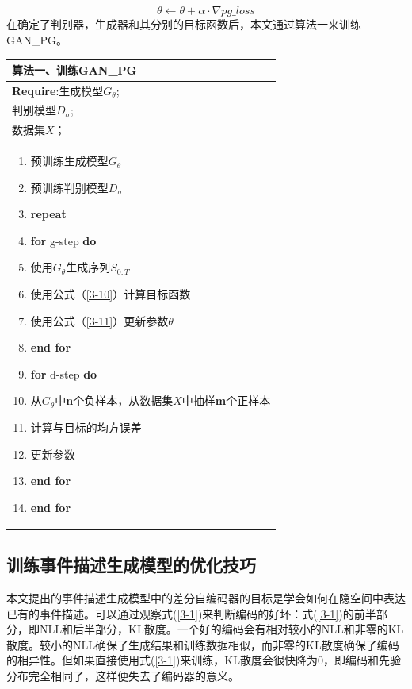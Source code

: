 \begin{equation}\label{3-11}
    \theta \leftarrow \theta + \alpha \cdot \nabla pg\_loss
\end{equation}
在确定了判别器，生成器和其分别的目标函数后，本文通过算法一来训练GAN\_PG。
\begin{table}[htb]
    
    \centering
        \begin{tabular*}{\linewidth}{p{\linewidth}}
\toprule
            算法一、训练GAN\_PG \\
\midrule
\textbf{Require}:生成模型$G_\theta$;\\
判别模型$D_\sigma$;\\
数据集$X$；\\ 
\begin{minipage}[t]{\linewidth}
\begin{enumerate}[itemsep=-3pt]
    \item 预训练生成模型$G_\theta$
    \item 预训练判别模型$D_\sigma$
    \item \textbf{repeat}
    \item \quad \textbf{for} g-step \textbf{do}
    \item \quad \quad 使用$G_\theta$生成序列$S_{0:T}$
    \item \quad \quad 使用公式（\ref{3-10}）计算目标函数
    \item \quad \quad 使用公式（\ref{3-11}）更新参数$\theta$
    \item \quad \textbf{end for}
    \item \quad \textbf{for} d-step \textbf{do}
    \item \quad \quad 从$G_\theta$中\textbf{n}个负样本，从数据集$X$中抽样\textbf{m}个正样本
    \item \quad \quad 计算与目标的均方误差
    \item \quad \quad 更新参数
    \item \quad \textbf{end for}  
    \item \textbf{end for}
\end{enumerate}
\end{minipage}\\
\bottomrule
        \end{tabular*}
    \label{s3-1}
\end{table}

\subsection{训练事件描述生成模型的优化技巧}\label{train_generator}
本文提出的事件描述生成模型中的差分自编码器的目标是学会如何在隐空间中表达已有的事件描述。可以通过观察式(\ref{3-1})来判断编码的好坏：式(\ref{3-1})的前半部分，即NLL和后半部分，KL散度。一个好的编码会有相对较小的NLL和非零的KL散度。较小的NLL确保了生成结果和训练数据相似，而非零的KL散度确保了编码的相异性。但如果直接使用式(\ref{3-1})来训练，KL散度会很快降为0，即编码和先验分布完全相同了，这样便失去了编码器的意义。

